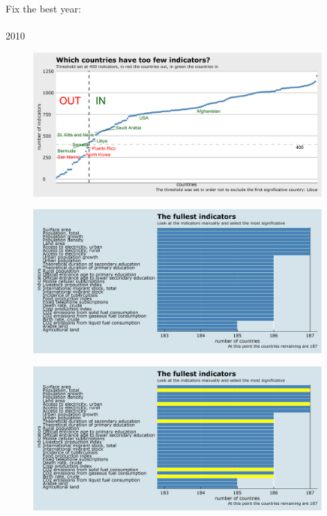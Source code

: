 \documentclass{beamer}
\begin{document}
\begin{frame}
	\begin{center}
		Fix the best year: 
		\\
		\\
		2010
	\end{center}
\end{frame}

\begin{frame}
	\begin{figure}
		\centering
		\includegraphics[width=11cm]{plot0005.png}
	\end{figure}
\end{frame}

\begin{frame}
	\begin{figure}
		\centering
		\includegraphics[width=11cm]{plot0006.png}
	\end{figure}
\end{frame}

\begin{frame}
	\begin{figure}
		\centering
		\includegraphics[width=11cm]{plot0007.png}
	\end{figure}
\end{frame}
\end{document}
